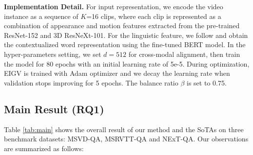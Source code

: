 \vspace{5pt}
\noindent \textbf{Implementation Detail.} 
For input representation, we encode the video instance as a sequence of $K$=16 clips, where each clip is represented as a combination of appearance and motion features extracted from the pre-trained ResNet-152 and 3D ResNeXt-101. For the linguistic feature, we follow \cite{DBLP:conf/cvpr/XiaoSYC21} and obtain the contextualized word representation using the fine-tuned BERT model. In the hyper-parameters setting, we set $d=512$ for cross-modal alignment, then train the model for 80 epochs with an initial learning rate of 5e-5.  During optimization, EIGV is trained with Adam optimizer and we decay the learning rate when validation stops improving for 5 epochs. The balance ratio $\beta$ is set to 0.75.

\subsection{Main Result (RQ1)}


Table \ref{tab:main} shows the overall result of our method and the SoTAs on three benchmark datasets: MSVD-QA, MSRVTT-QA and NExT-QA. Our observations are summarized as follows:

